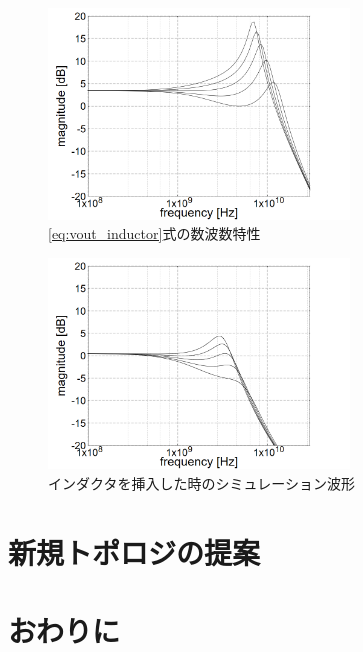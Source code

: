 \documentclass[twocolumn]{jsarticle}
\begin{document}
    \begin{figure}[H]
        \begin{center}
            \includegraphics*[width = 80mm]{figures/inductor_theoretical_monochrome.PNG}
            \caption{\eqref{eq:vout_inductor}式の数波数特性}
            \label{fig:vout_inductor_theoretical}
        \end{center}
    \end{figure}
    \begin{figure}[H]
        \begin{center}
            \includegraphics*[width = 80mm]{figures/inductor_simulation_monochrome.PNG}
            \caption{インダクタを挿入した時のシミュレーション波形}
            \label{fig:vout_inductor_simulation}
        \end{center}
    \end{figure}

\section{新規トポロジの提案}


\section{おわりに}
\end{document}
